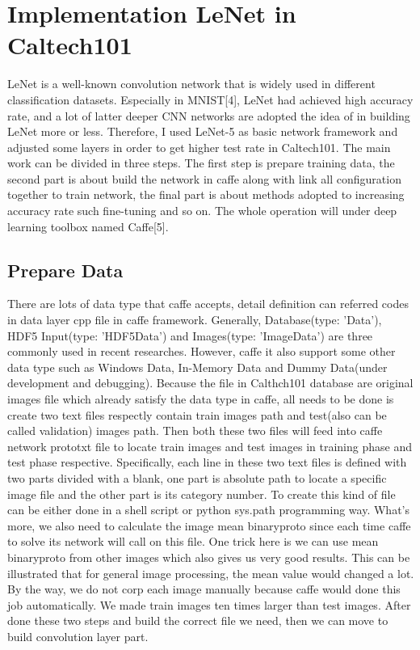 \documentclass{article}
\begin{document}
\section{Implementation LeNet in Caltech101}
LeNet is a well-known convolution network that is widely used in different classification datasets. Especially in MNIST[4], LeNet had achieved high accuracy rate, and a lot of latter deeper CNN networks are adopted the idea of in building LeNet more or less. Therefore, I used LeNet-5 as basic network framework and adjusted some layers in order to get higher test rate in Caltech101. The main work can be divided in three steps. The first step is prepare training data, the second part is about build the network in caffe along with link all configuration together to train network, the final part is about methods adopted to increasing accuracy rate such fine-tuning and so on. The whole operation will under deep learning toolbox named Caffe[5].
\subsection{Prepare Data}
There are lots of data type that caffe accepts, detail definition can referred codes in data layer cpp file in caffe framework. Generally, Database(type: 'Data'), HDF5 Input(type: 'HDF5Data') and Images(type: 'ImageData') are three commonly used in recent researches. However, caffe it also support some other data type such as Windows Data, In-Memory Data and Dummy Data(under development and debugging). Because the file in Calthch101 database are original images file which already satisfy the data type in caffe, all needs to be done is create two text files respectly contain train images path and test(also can be called validation) images path. Then both these two files will feed into caffe network prototxt file to locate train images and test images in training phase and test phase respective. Specifically, each line in these two text files is defined with two parts divided with a blank, one part is absolute path to locate a specific image file and the other part is its category number. To create this kind of file can be either done in a shell script or python sys.path programming way. What's more, we also need to calculate the image mean binaryproto since each time caffe to solve its network will call on this file. One trick here is we can use mean binaryproto from other images which also gives us very good results. This can be illustrated that for general image processing, the mean value would changed a lot. By the way, we do not corp each image manually because caffe would done this job automatically. We made train images ten times larger than test images. After done these two steps and build the correct file we need, then we can move to build convolution layer part.
\end{document}
